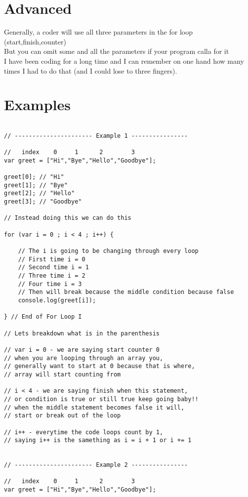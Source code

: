 \documentclass[12pt, letterpaper]{article}
\begin{document}
\section*{Advanced}

Generally, a coder will use all three parameters in the for loop (start,finish,counter)\\
But you can omit some and all the parameters if your program calla for it\\
I have been coding for a long time and I can remember on one hand how many times I had to do that 
(and I could lose to three fingers).

\section*{Examples}

\begin{lstlisting}

// ---------------------- Example 1 ----------------

//   index    0     1      2        3
var greet = ["Hi","Bye","Hello","Goodbye"];

greet[0]; // "Hi"
greet[1]; // "Bye"
greet[2]; // "Hello"
greet[3]; // "Goodbye"

// Instead doing this we can do this

for (var i = 0 ; i < 4 ; i++) {

	// The i is going to be changing through every loop
	// First time i = 0
	// Second time i = 1
	// Three time i = 2
	// Four time i = 3
	// Then will break because the middle condition because false 
	console.log(greet[i]);

} // End of For Loop I

// Lets breakdown what is in the parenthesis

// var i = 0 - we are saying start counter 0 
// when you are looping through an array you,
// generally want to start at 0 because that is where,
// array will start counting from

// i < 4 - we are saying finish when this statement,
// or condition is true or still true keep going baby!!
// when the middle statement becomes false it will,
// start or break out of the loop

// i++ - everytime the code loops count by 1,
// saying i++ is the samething as i = i + 1 or i += 1 


// ---------------------- Example 2 ----------------

//   index    0     1      2        3
var greet = ["Hi","Bye","Hello","Goodbye"];


\end{lstlisting}
\end{document}
